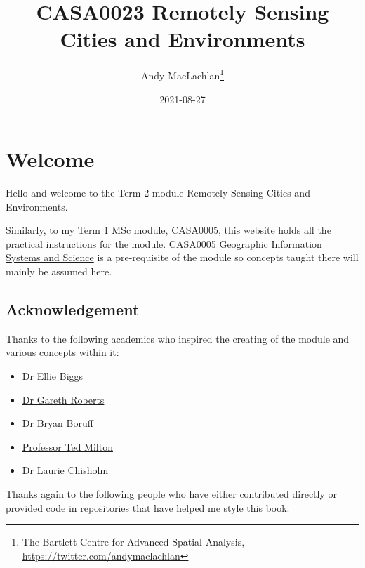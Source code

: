 \documentclass[
]{book}
\title{CASA0023 Remotely Sensing Cities and Environments}
\author{Andy MacLachlan\footnote{The Bartlett Centre for Advanced Spatial Analysis, \url{https://twitter.com/andymaclachlan}}}
\date{2021-08-27}
\providecommand{\tightlist}{%
  \setlength{\itemsep}{0pt}\setlength{\parskip}{0pt}}
\begin{document}
\maketitle

\hypertarget{welcome}{%
\chapter*{Welcome}\label{welcome}}

Hello and welcome to the Term 2 module Remotely Sensing Cities and Environments.

Similarly, to my Term 1 MSc module, CASA0005, this website holds all the practical instructions for the module. \href{https://andrewmaclachlan.github.io/CASA0005repo/}{CASA0005 Geographic Information Systems and Science} is a pre-requisite of the module so concepts taught there will mainly be assumed here.

\hypertarget{acknowledgement}{%
\section*{Acknowledgement}\label{acknowledgement}}

Thanks to the following academics who inspired the creating of the module and various concepts within it:

\begin{itemize}
\tightlist
\item
  \href{https://twitter.com/EllieMBiggs}{Dr Ellie Biggs}
\item
  \href{https://www.southampton.ac.uk/geography/about/staff/gjr1f10.page}{Dr Gareth Roberts}
\item
  \href{https://directory.uwa.edu.au/view?dn=cn\%3DBryan\%20Boruff\%2Cou\%3DDepartment\%20of\%20Geography\%20and\%20Planning\%2Cou\%3DArts\%5C2C\%20Business\%5C2C\%20Law\%20and\%20Education\%2Cou\%3DCollege\%20of\%20Schools\%2Co\%3DThe\%20University\%20of\%20Western\%20Australia}{Dr Bryan Boruff}
\item
  \href{https://www.southampton.ac.uk/geography/about/staff/ejm.page}{Professor Ted Milton}
\item
  \href{https://scholars.uow.edu.au/display/laurie_chisholm}{Dr Laurie Chisholm}
\end{itemize}

Thanks again to the following people who have either contributed directly or provided code in repositories that have helped me style this book:
\end{document}
